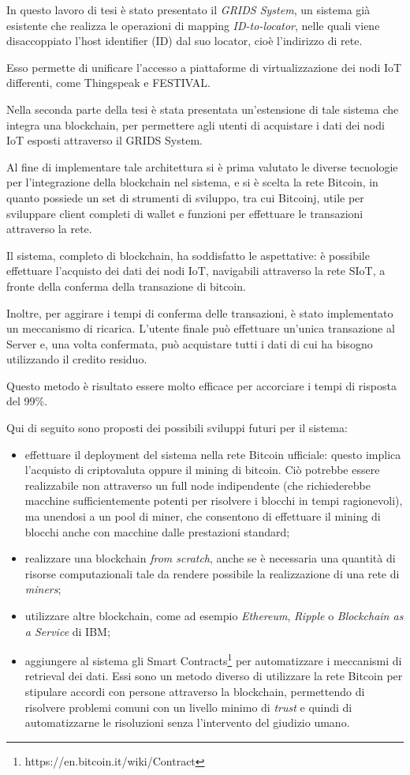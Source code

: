 In questo lavoro di tesi è stato presentato il \textit{GRIDS System}, un sistema già esistente che realizza le operazioni di mapping \textit{ID-to-locator}, nelle quali viene disaccoppiato l'host identifier (ID) dal suo locator, cioè l'indirizzo di rete.

Esso permette di unificare l'accesso a piattaforme di virtualizzazione dei nodi IoT differenti, come Thingspeak e FESTIVAL.

Nella seconda parte della tesi è stata presentata un'estensione di tale sistema che integra una blockchain, per permettere agli utenti di acquistare i dati dei nodi IoT esposti attraverso il GRIDS System.

Al fine di implementare tale architettura si è prima valutato le diverse tecnologie per l'integrazione della blockchain nel sistema, e si è scelta la rete Bitcoin, in quanto possiede un set di strumenti di sviluppo, tra cui Bitcoinj, utile per sviluppare client completi di wallet e funzioni per effettuare le transazioni attraverso la rete.

Il sistema, completo di blockchain, ha soddisfatto le aspettative: è possibile effettuare l'acquisto dei dati dei nodi IoT, navigabili attraverso la rete SIoT, a fronte della conferma della transazione di bitcoin. 

Inoltre, per aggirare i tempi di conferma delle transazioni, è stato implementato un meccanismo di ricarica. L'utente finale può effettuare un'unica transazione al Server e, una volta confermata, può acquistare tutti i dati di cui ha bisogno utilizzando il credito residuo. 

Questo metodo è risultato essere molto efficace per accorciare i tempi di risposta del 99\%.


Qui di seguito sono proposti dei possibili sviluppi futuri per il sistema: 
\begin{itemize}
    \item effettuare il deployment del sistema nella rete Bitcoin ufficiale: questo implica l'acquisto di criptovaluta oppure il mining di bitcoin. Ciò potrebbe essere realizzabile non attraverso un full node indipendente (che richiederebbe macchine sufficientemente potenti per risolvere i blocchi in tempi ragionevoli), ma unendosi a un pool di miner, che consentono di effettuare il mining di blocchi anche con macchine dalle prestazioni standard;
    \item realizzare una blockchain \textit{from scratch}, anche se è necessaria una quantità di risorse computazionali tale da rendere possibile la realizzazione di una rete di \textit{miners};
    \item utilizzare altre blockchain, come ad esempio \textit{Ethereum}, \textit{Ripple} o \textit{Blockchain as a Service} di IBM;
    \item aggiungere al sistema gli Smart Contracts\footnote{https://en.bitcoin.it/wiki/Contract} per automatizzare i meccanismi di retrieval dei dati. Essi sono un metodo diverso di utilizzare la rete Bitcoin per stipulare accordi con persone attraverso la blockchain, permettendo di risolvere problemi comuni con un livello minimo di \textit{trust} e quindi di automatizzarne le risoluzioni senza l'intervento del giudizio umano. 
\end{itemize}
